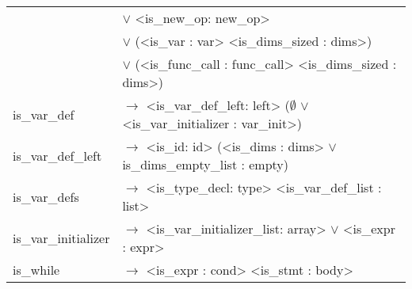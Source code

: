\documentclass[a4paper]{article}
\begin{document}
\begin{tabular}{ll}
								& $\vee$ <is\_new\_op: new\_op> \\
								& $\vee$ (<is\_var : var> <is\_dims\_sized : dims>) \\
								& $\vee$ (<is\_func\_call : func\_call> <is\_dims\_sized : dims>) \\
	is\_var\_def			 	& $\to$ <is\_var\_def\_left: left> ($\emptyset$ $\vee$ <is\_var\_initializer : var\_init>) \\
	is\_var\_def\_left		 	& $\to$ <is\_id: id> (<is\_dims : dims> $\vee$ is\_dims\_empty\_list : empty) \\
	is\_var\_defs		 		& $\to$ <is\_type\_decl: type> <is\_var\_def\_list : list> \\
	is\_var\_initializer 		& $\to$ <is\_var\_initializer\_list: array> $\vee$ <is\_expr : expr> \\
	is\_while 					& $\to$ <is\_expr : cond> <is\_stmt : body> \\
\end{tabular}
\end{document}
